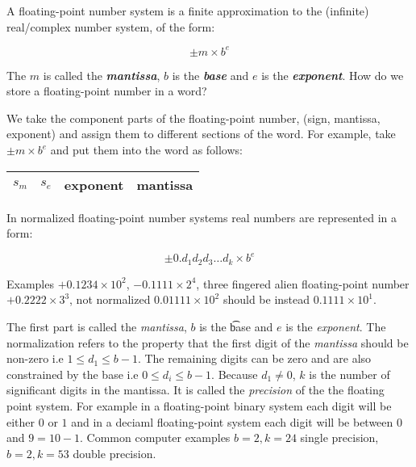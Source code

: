 \documentclass [titlepage,12pt,letter] {article}
\begin{document}
A floating-point number system is a finite approximation to the
(infinite) real/complex number system, of the form:

\begin{equation} 
\pm m \times b ^ e 
\end{equation}

The $m$ is called the {\it \bf mantissa}, $b$ is the {\it \bf base} and
$e$ is the {\it \bf exponent}. How do we store a floating-point number in a word?  

We take the component parts of the floating-point number, (sign, mantissa, exponent) and assign them to different sections of the word. 
For example, take $\pm m \times b ^ e$ and put them into the word as follows:

\begin{center}
\begin{tabular}{ |c|c|c|c| } 
 \hline
 $s_m$ & $s_e$ & exponent & \hspace{0.25 in} mantissa \hspace{0.25 in} \\ 
 \hline
\end{tabular}
\end{center}

In normalized floating-point number systems real numbers are represented in a form: 

\begin{equation} 
\pm 0.d_1d_2d_3 \dots d_k \times b ^ e 
\end{equation} 
\noindent

Examples $+0.1234 \times 10^{2}$, $-0.1111 \times 2^{4}$, three fingered alien 
floating-point number $+0.2222 \times 3^{3}$, not normalized $ 0.01111 \times 10^{2}$ should be instead $0.1111 \times 10^{1}$. 
 
The first part is called the {\it mantissa}, $b$ is the {\t base} and
$e$ is the {\it exponent}. The normalization refers to the property
that the first digit of the {\it mantissa} should be non-zero i.e $ 1
\leq d_1 \leq b-1$. The remaining digits can be zero and are also
constrained by the base i.e $ 0 \leq d_i \leq b-1$. Because $d_1 \neq
0$, $k$ is the number of significant digits in the mantissa. It is
called the {\it precision} of the the floating point system.  For
example in a floating-point binary system each digit will be either $0$
or $1$ and in a deciaml floating-point system each digit will be between
$0$ and $9 = 10-1$. Common computer examples $b=2,k=24$ single precision, $b=2, k=53$ double precision. 
\end{document}
